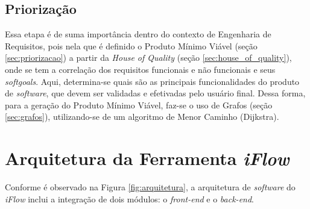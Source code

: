 


\subsection{Priorização}

Essa etapa é de suma importância dentro do contexto de Engenharia de Requisitos, pois nela que é definido o Produto Mínimo Viável (seção \ref{sec:priorizacao}) a partir da \textit{House of Quality} (seção \ref{sec:house_of_quality}), onde se tem a correlação dos requisitos funcionais e não funcionais e seus \textit{softgoals}. Aqui, determina-se quais são as principais funcionalidades do produto de \textit{software}, que devem ser validadas e efetivadas pelo usuário final. Dessa forma, para a geração do Produto Mínimo Viável, faz-se o uso de Grafos (seção \ref{sec:grafos}), utilizando-se de um algoritmo de Menor Caminho (Dijkstra).

\section{Arquitetura da Ferramenta \textit{iFlow}}

\label{sec:arquitetura_da_solucao}

Conforme é observado na Figura \ref{fig:arquitetura}, a arquitetura de \textit{software} do \textit{iFlow} inclui a integração de dois módulos: o \textit{front-end} e o \textit{back-end}.

